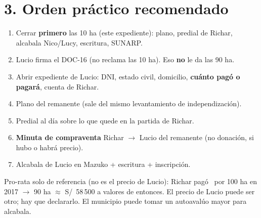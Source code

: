 \documentclass[12pt,a4paper]{article}
\begin{document}
\section*{3. Orden práctico recomendado}

\begin{enumerate}[leftmargin=1.15cm,itemsep=0.2em]
\item Cerrar \textbf{primero} las 10 ha (este expediente): plano, predial de Richar, alcabala Nico/Lucy, escritura, SUNARP.
\item Lucio firma el DOC-16 (no reclama las 10 ha). Eso \textbf{no} le da las 90 ha.
\item Abrir expediente de Lucio: DNI, estado civil, domicilio, \textbf{cuánto pagó o pagará}, cuenta de Richar.
\item Plano del remanente (sale del mismo levantamiento de independización).
\item Predial al día sobre lo que quede en la partida de Richar.
\item \textbf{Minuta de compraventa} Richar $\rightarrow$ Lucio del remanente (no donación, si hubo o habrá precio).
\item Alcabala de Lucio en Mazuko + escritura + inscripción.
\end{enumerate}

\vspace{0.25em}
\noindent Pro-rata solo de referencia (no es el precio de Lucio): Richar pagó \PrecioAdquisicionMatriz\ por 100 ha en 2017 $\rightarrow$ 90 ha $\approx$ S/\ 58\,500 a valores de entonces. El precio de Lucio puede ser otro; hay que declararlo. El municipio puede tomar un autoavalúo mayor para alcabala.

\LugarFecha
\noindent
{}
\end{document}
